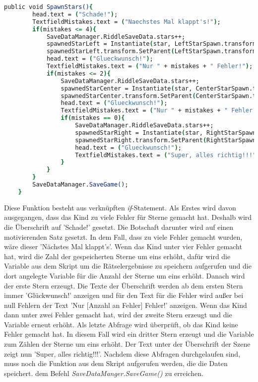 \begin{lstlisting}[language=csh, caption={SpawnStars.cs Start-Funktion}]
	public void SpawnStars(){
		head.text = ("Schade!");
		TextfieldMistakes.text = ("Naechstes Mal klappt's!");
		if(mistakes <= 4){
			SaveDataManager.RiddleSaveData.stars++;
			spawnedStarLeft = Instantiate(star, LeftStarSpawn.transform.position, Quaternion.identity);
			spawnedStarLeft.transform.SetParent(LeftStarSpawn.transform);
			head.text = ("Glueckwunsch!");
			TextfieldMistakes.text = ("Nur " + mistakes + " Fehler!");
			if(mistakes <= 2){
				SaveDataManager.RiddleSaveData.stars++;
				spawnedStarCenter = Instantiate(star, CenterStarSpawn.transform.position, Quaternion.identity);
				spawnedStarCenter.transform.SetParent(CenterStarSpawn.transform);
				head.text = ("Glueckwunsch!");
				TextfieldMistakes.text = ("Nur " + mistakes + " Fehler!");
				if(mistakes == 0){
					SaveDataManager.RiddleSaveData.stars++;
					spawnedStarRight = Instantiate(star, RightStarSpawn.transform.position, Quaternion.identity);
					spawnedStarRight.transform.SetParent(RightStarSpawn.transform);
					head.text = ("Glueckwunsch!");
					TextfieldMistakes.text = ("Super, alles richtig!!!");
				}
			}
		}
		SaveDataManager.SaveGame();
	}
\end{lstlisting}
Diese Funktion besteht aus verknüpften \textit{if}-Statement. Als Erstes wird davon ausgegangen, dass das Kind zu viele Fehler für Sterne gemacht hat. Deshalb wird die Überschrift auf 'Schade!' gesetzt. Die Botschaft darunter wird auf einen motivierenden Satz gesetzt. In dem Fall, dass zu viele Fehler gemacht wurden, wäre dieser 'Nächstes Mal klappt's'. Wenn das Kind unter vier Fehler gemacht hat, wird die Zahl der gespeicherten Sterne um eins erhöht, dafür wird die Variable aus dem Skript um die Rätselergebnisse zu speichern aufgerufen und die dort angelegte Variable für die Anzahl der Sterne um eins erhöht. Danach wird der erste Stern erzeugt. Die Texte der Überschrift werden ab dem ersten Stern immer 'Glückwunsch!' anzeigen und für den Text für die Fehler wird außer bei null Fehlern der Text 'Nur [Anzahl an Fehler] Fehler!' anzeigen. Wenn das Kind dann unter zwei Fehler gemacht hat, wird der zweite Stern erzeugt und die Variable erneut erhöht. Als letzte Abfrage wird überprüft, ob das Kind keine Fehler gemacht hat. In diesem Fall wird ein dritter Stern erzeugt und die Variable zum Zählen der Sterne um eins erhöht. Der Text unter der Überschrift der Szene zeigt nun 'Super, alles richtig!!!'. Nachdem diese Abfragen durchgelaufen sind, muss noch die Funktion aus dem Skript aufgerufen werden, die die Daten speichert. dem Befehl \textit{SaveDataManger.SaveGame()} zu erreichen.\\